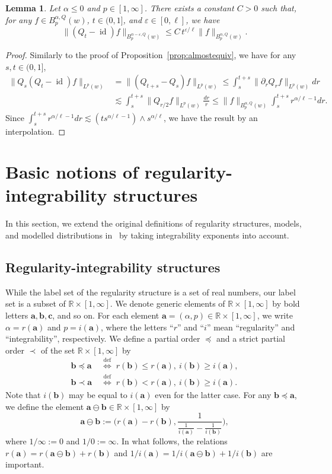 \documentclass[10pt]{amsart}
\newtheorem{lemm}[theo]{Lemma}
\theoremstyle{definition}
\numberwithin{equation}{section}
\newcommand{\bbR}{\mathbb{R}}
\newcommand{\bfa}{\mathbf{a}}
\newcommand{\bfb}{\mathbf{b}}
\newcommand{\bfc}{\mathbf{c}}
\newcommand{\bfaob}{\mathbf{a}\ominus\mathbf{b}}
\DeclareMathOperator{\id}{id}
\DeclareMathOperator{\deff}{def}
\begin{document}
\begin{lemm}\label{lem:timecontinuity}
Let $\alpha\le0$ and $p\in[1,\infty]$. There exists a constant $C>0$ such that, for any $f\in B_p^{\alpha,Q}(w)$, $t\in(0,1]$, and $\varepsilon\in[0,\ell]$, we have
\[
\|(Q_t-\id)f\|_{B_p^{\alpha-\varepsilon,Q}(w)}
\le C\, t^{\varepsilon/\ell}\|f\|_{B_p^{\alpha,Q}(w)}.
\]
\end{lemm}

\begin{proof}
Similarly to the proof of Proposition~\ref{prop:almostequiv}, we have for any $s,t\in(0,1]$,
\begin{align*}
\|Q_s(Q_t-\id)f\|_{L^p(w)} &=\|(Q_{t+s}-Q_s)f\|_{L^p(w)}\le\int_s^{t+s}\|\partial_rQ_rf\|_{L^p(w)}dr\\
&\lesssim\int_s^{t+s}\|Q_{r/2}f\|_{L^p(w)}\frac{dr}r
\le\|f\|_{B_p^{\alpha,Q}(w)}\int_s^{t+s}r^{\alpha/\ell-1}dr.
\end{align*}
Since $\int_s^{t+s}r^{\alpha/\ell-1}dr\lesssim (ts^{\alpha/\ell-1})\wedge s^{\alpha/\ell}$, we have the result by an interpolation.
\end{proof}
\section{Basic notions of regularity-integrability structures}\label{section:RI}

In this section, we extend the original definitions of regularity structures, models, and modelled distributions in~\cite{Hai14} by taking integrability exponents into account.

\subsection{Regularity-integrability structures}

While the label set of the regularity structure is a set of real numbers, our label set is a subset of $\bbR\times[1,\infty]$. We denote generic elements of $\bbR\times[1,\infty]$ by bold letters $\bfa,\bfb,\bfc$, and so on. For each element $\bfa=(\alpha,p)\in\bbR\times[1,\infty]$, we write $\alpha=r(\bfa)$ and $p=i(\bfa)$, where the letters ``$r$'' and ``$i$'' mean ``regularity'' and ``integrability'', respectively. We define a partial order $\preceq$ and a strict partial order $\prec$ of the set $\bbR\times[1,\infty]$ by
\begin{align*}
\bfb\preceq\bfa&\;\overset{\deff}
{\Longleftrightarrow}\; r(\bfb)\le r(\bfa),\ i(\bfb)\ge i(\bfa),\\
\bfb\prec\bfa&\;\overset{\deff}{\Longleftrightarrow}\; r(\bfb)<r(\bfa),\ i(\bfb)\ge i(\bfa).
\end{align*}
Note that $i(\bfb)$ may be equal to $i(\bfa)$ even for the latter case. For any $\bfb\preceq\bfa$, we define the element $\bfaob\in\bbR\times[1,\infty]$ by
\[
\bfaob:=\Bigg(r(\bfa)-r(\bfb),\frac1{\frac1{i(\bfa)}-\frac1{i(\bfb)}}\Bigg),
\]
where $1/\infty:=0$ and $1/0:=\infty$. In what follows, the relations $r(\bfa)=r(\bfa\ominus\bfb)+r(\bfb)$ and $1/{i(\bfa)}=1/{i(\bfaob)}+1/{i(\bfb)}$ are important.
\end{document}
